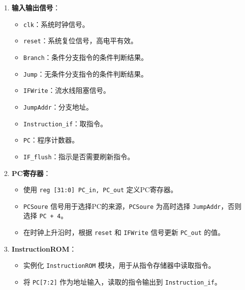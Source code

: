 \documentclass[12pt,hyperref,a4paper,UTF8]{ctexart}
\begin{document}
\begin{enumerate}
    \item \textbf{输入输出信号}：
    \begin{itemize}
        \item \texttt{clk}：系统时钟信号。
        \item \texttt{reset}：系统复位信号，高电平有效。
        \item \texttt{Branch}：条件分支指令的条件判断结果。
        \item \texttt{Jump}：无条件分支指令的条件判断结果。
        \item \texttt{IFWrite}：流水线阻塞信号。
        \item \texttt{JumpAddr}：分支地址。
        \item \texttt{Instruction\_if}：取指令。
        \item \texttt{PC}：程序计数器。
        \item \texttt{IF\_flush}：指示是否需要刷新指令。
    \end{itemize}

    \item \textbf{PC寄存器}：
    \begin{itemize}
        \item 使用 \texttt{reg [31:0] PC\_in, PC\_out} 定义PC寄存器。
        \item \texttt{PCSoure} 信号用于选择PC的来源，\texttt{PCSoure} 为高时选择 \texttt{JumpAddr}，否则选择 \texttt{PC + 4}。
        \item 在时钟上升沿时，根据 \texttt{reset} 和 \texttt{IFWrite} 信号更新 \texttt{PC\_out} 的值。
    \end{itemize}

    \item \textbf{InstructionROM}：
    \begin{itemize}
        \item 实例化 \texttt{InstructionROM} 模块，用于从指令存储器中读取指令。
        \item 将 \texttt{PC[7:2]} 作为地址输入，读取的指令输出到 \texttt{Instruction\_if}。
    \end{itemize}
\end{enumerate}
\end{document}

